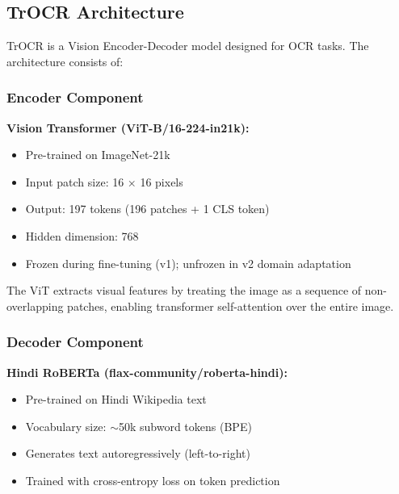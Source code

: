 \documentclass[14pt,a4paper]{article}
\begin{document}
\subsection{TrOCR Architecture}

TrOCR is a Vision Encoder-Decoder model designed for OCR tasks. The architecture consists of:

\begin{center}
\end{center}

\subsubsection{Encoder Component}

\textbf{Vision Transformer (ViT-B/16-224-in21k):}
\begin{itemize}
    \item Pre-trained on ImageNet-21k
    \item Input patch size: 16 × 16 pixels
    \item Output: 197 tokens (196 patches + 1 CLS token)
    \item Hidden dimension: 768
    \item Frozen during fine-tuning (v1); unfrozen in v2 domain adaptation
\end{itemize}

The ViT extracts visual features by treating the image as a sequence of non-overlapping patches, enabling transformer self-attention over the entire image.

\subsubsection{Decoder Component}

\textbf{Hindi RoBERTa (flax-community/roberta-hindi):}
\begin{itemize}
    \item Pre-trained on Hindi Wikipedia text
    \item Vocabulary size: $\sim$50k subword tokens (BPE)
    \item Generates text autoregressively (left-to-right)
    \item Trained with cross-entropy loss on token prediction
\end{itemize}
\end{document}
